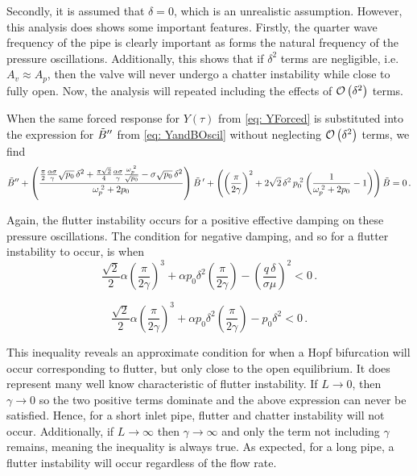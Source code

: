 Secondly, it is assumed that $\delta = 0$, which is an unrealistic assumption. However, this analysis does shows some important features. Firstly, the quarter wave frequency of the pipe is clearly important as forms the natural frequency of the pressure oscillations. Additionally, this shows that if $\delta^2$ terms are negligible, i.e. $A_v \approx A_p$, then the valve will never undergo a chatter instability while close to fully open. Now, the analysis will repeated including the effects of $\mathcal{O}\left( \delta^2 \right)$ terms.

When the same forced response for $Y(\tau)$ from \cref{eq: YForced} is substituted into the expression for $\tilde{B}{''}$ from \cref{eq: YandBOscil} without neglecting $\mathcal{O}\left( \delta^2 \right)$ terms, we find
~
\begin{equation*}
    \tilde{B}{''} +
    \left( \frac{
    \frac{\pi}{2} \frac{\alpha \sigma}{\gamma} \sqrt{p_0} \, \delta^2 + \frac{\pi \sqrt{2}}{4} \frac{\alpha \sigma}{\gamma} \frac{\omega_p^{\;2}}{\sqrt{p_0}} - \sigma \sqrt{p_0} \, \delta^2
    }{\omega_p^{\;2} + 2 p_0} \right) \tilde{B}\,{'} +
    \left( \left( \frac{\pi}{2 \gamma} \right)^2 + 2 \sqrt{2} \, \delta^2 \, p_0^{\;2} \left( \frac{1}{\omega_p^{\;2} + 2 p_0} - 1 \right) \right) \tilde{B} = 0 \, .
\end{equation*}

Again, the flutter instability occurs for a positive effective damping on these pressure oscillations. The condition for negative damping, and so for a flutter instability to occur, is when
~
\begin{equation} \label{eq: QWMStabilityInequality}
    \frac{\sqrt{2}}{2} \alpha \left( \frac{\pi}{2 \gamma} \right)^3 + \alpha p_0 \delta^2 \left( \frac{\pi}{2 \gamma} \right) - \left( \frac{q \, \delta}{\sigma \mu} \right)^2 < 0 \, .
\end{equation}

\begin{equation*} %
    \frac{\sqrt{2}}{2} \alpha \left( \frac{\pi}{2 \gamma} \right)^3 + \alpha p_0 \delta^2 \left( \frac{\pi}{2 \gamma} \right) - p_0 \delta^2 < 0 \, .
\end{equation*}

This inequality reveals an approximate condition for when a Hopf bifurcation will occur corresponding to flutter, but only close to the open equilibrium. It does represent many well know characteristic of flutter instability. If $L \rightarrow 0$, then $\gamma \rightarrow 0$ so the two positive terms dominate and the above expression can never be satisfied. Hence, for a short inlet pipe, flutter and chatter instability will not occur. Additionally, if $L \rightarrow \infty$ then $\gamma \rightarrow \infty$ and only the term not including $\gamma$ remains, meaning the inequality is always true. As expected, for a long pipe, a flutter instability will occur regardless of the flow rate.

